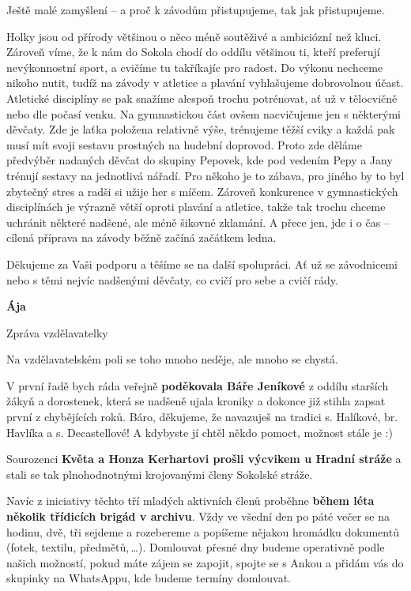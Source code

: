 \documentclass[11pt]{article}
\newcommand{\post}[1]{%
\begin{center}
{\huge \tyrs #1}
\end{center}
}
\newcommand{\signature}[2]{%
  \begin{flushright}
    \textbf{#1}\\#2
  \end{flushright}
}
\begin{document}
Ještě malé zamyšlení – a proč k závodům přistupujeme, tak jak přistupujeme.

Holky jsou od přírody většinou o něco méně soutěživé a ambiciózní než kluci. Zároveň víme, že k nám do Sokola chodí do oddílu většinou ti, kteří preferují nevýkonnostní sport, a cvičíme tu takříkajíc pro radost. Do výkonu nechceme nikoho nutit, tudíž na závody v atletice a plavání vyhlašujeme dobrovolnou účast. Atletické disciplíny se pak snažíme alespoň trochu potrénovat, ať už v tělocvičně nebo dle počasí venku. Na gymnastickou část ovšem nacvičujeme jen s některými děvčaty. Zde je laťka položena relativně výše, trénujeme těžší cviky a každá pak musí mít svoji sestavu prostných na hudební doprovod. Proto zde děláme předvýběr nadaných děvčat do skupiny Pepovek, kde pod vedením Pepy a Jany trénují sestavy na jednotlivá nářadí. Pro někoho je to zábava, pro jiného by to byl zbytečný stres a radši si užije her s míčem. Zároveň konkurence v gymnastických disciplínách je výrazně větší oproti plavání a atletice, takže tak trochu chceme uchránit některé nadšené, ale méně šikovné zklamání. A přece jen, jde i o čas – cílená příprava na závody běžně začíná začátkem ledna.

Děkujeme za Vaši podporu a těšíme se na další spolupráci. Ať už se závodnicemi nebo s těmi nejvíc nadšenými děvčaty, co cvičí pro sebe a cvičí rády.

\signature{Ája}{}

\vspace*{24pt}

\clearpage
\post{Zpráva vzdělavatelky}
Na vzdělavatelském poli se toho mnoho neděje, ale mnoho se chystá.

V první řadě bych ráda veřejně \textbf{poděkovala Báře Jeníkové} z oddílu starších žákyň a dorostenek, která se nadšeně ujala kroniky a dokonce již stihla zapsat první z chybějících roků. Báro, děkujeme, že navazuješ na tradici s. Halíkové, br. Havlíka a s. Decastellové! A kdybyste jí chtěl někdo pomoct, možnost stále je :)

Sourozenci \textbf{Květa a Honza Kerhartovi prošli výcvikem u Hradní stráže} a stali se tak plnohodnotnými krojovanými členy Sokolské stráže.

Navíc z iniciativy těchto tří mladých aktivních členů proběhne \textbf{během léta několik třídicích brigád v archivu}. Vždy ve všední den po páté večer se na hodinu, dvě, tři sejdeme a rozebereme a popíšeme nějakou hromádku dokumentů (fotek, textilu, předmětů,\,\ldots{}). Domlouvat přesné dny budeme operativně podle našich možností, pokud máte zájem se zapojit, spojte se s Ankou a přidám vás do skupinky na WhatsAppu, kde budeme termíny domlouvat.
\end{document}

